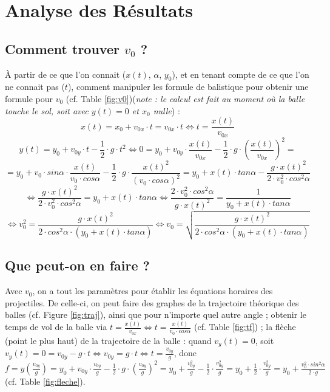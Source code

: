 \documentclass[11pt]{article}
\begin{document}
	
\clearpage	
	
\section{Analyse des Résultats}
\subsection*{Comment trouver $v_0$ ?}
À partir de ce que l'on connait ($x(t)$, $\alpha$, $y_0$), et en tenant compte de ce que l'on ne connait pas ($t$), comment manipuler les formule de balistique pour obtenir une formule pour $v_0$ (cf. Table \ref{fig:v0})(\textit{note : le calcul est fait au moment où la balle touche le sol, soit avec $y(t) = 0$ et $x_0$ nulle}) :
$$x(t) = x_0 + v_{0x} \cdot t = v_{0x} \cdot t \Leftrightarrow t = \frac{x(t)}{v_{0x}}$$
$$y(t) =  y_0 + v_{0y} \cdot t - \frac{1}{2} \cdot g \cdot t^2 \Leftrightarrow 0 =  y_0 + v_{0y} \cdot \frac{x(t)}{v_{0x}} - \frac{1}{2} \cdot g \cdot \left(\frac{x(t)}{v_{0x}}\right)^2 =$$$$= y_0 + v_0 \cdot sin\alpha \cdot \frac{x(t)}{v_0 \cdot cos\alpha} - \frac{1}{2} \cdot g \cdot \frac{x(t)^2}{(v_0 \cdot cos\alpha)^2} = y_0 + x(t) \cdot tan\alpha - \frac{g \cdot x(t)^2}{2 \cdot v_0^2 \cdot cos^2\alpha} $$$$\Leftrightarrow \frac{g \cdot x(t)^2}{2 \cdot v_0^2 \cdot cos^2\alpha} = y_0 + x(t) \cdot tan\alpha \Leftrightarrow \frac{2 \cdot v_0^2 \cdot cos^2\alpha}{g \cdot x(t)^2}= \frac{1}{y_0 + x(t) \cdot tan\alpha}$$$$\Leftrightarrow v_0^2 = \frac{g \cdot x(t)^2}{2 \cdot cos^2\alpha \cdot (y_0 + x(t) \cdot tan\alpha)} \Leftrightarrow v_0 = \sqrt{\frac{g \cdot x(t)^2}{2 \cdot cos^2\alpha \cdot (y_0 + x(t) \cdot tan\alpha)}} $$
\subsection*{Que peut-on en faire ?}
Avec $v_0$, on a tout les paramètres pour établir les équations horaires des projectiles. De celle-ci, on peut faire des graphes de la trajectoire théorique des balles (cf. Figure \ref{fig:traj}), ainsi que pour n'importe quel autre angle ; obtenir le temps de vol de la balle  via $t = \frac{x(t)}{v_{0x}} \Leftrightarrow t = \frac{x(t)}{v_0 \cdot cos\alpha}$ (cf. Table \ref{fig:tf}) ; la flèche (point le plus haut) de la trajectoire de la balle : quand $v_y(t) = 0$, soit $v_y(t) = 0 = v_{0y} - g \cdot t \Leftrightarrow v_{0y} = g \cdot t \Leftrightarrow t = \frac{v_{0y}}{g}$, donc $f = y\left(\frac{v_{0y}}{g}\right) = y_0 + v_{0y} \cdot \frac{v_{0y}}{g} - \frac{1}{2} \cdot g \cdot \left(\frac{v_{0y}}{g}\right)^2 = y_0 + \frac{v_{0y}^2}{g} - \frac{1}{2} \cdot \frac{v_{0y}^2}{g} = y_0 + \frac{1}{2} \cdot \frac{v_{0y}^2}{g} = y_0 + \frac{v_0^2 \cdot sin^2\alpha}{2 \cdot g}$(cf. Table \ref{fig:fleche}).
\end{document}
